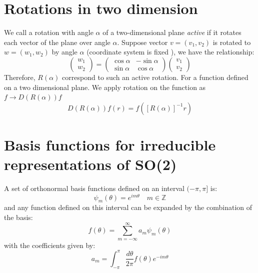 \documentclass{amsart}
\theoremstyle{remark}
\theoremstyle{remark}
\theoremstyle{definition}
\begin{document}
\section*{Rotations in two dimension}
We call a rotation with angle $\alpha$ of a two-dimensional plane \emph{active} 
if it rotates each vector of the plane over angle $\alpha$. 
Suppose vector $v = (v_1, v_2)$ is rotated to $w = (w_1, w_2)$ by angle $\alpha$ (coordinate system is fixed ), 
we have the relationship:
\begin{equation*}
    \left(\begin{matrix}
        w_1 \\ w_2
    \end{matrix}\right) = \left(\begin{matrix}
        \cos\alpha & -\sin\alpha \\ \sin\alpha & \cos\alpha
    \end{matrix}\right) \left(\begin{matrix}
        v_1 \\ v_2
    \end{matrix}\right)
\end{equation*}
Therefore, $R(\alpha)$ correspond to such an active rotation. 
For a function defined on a two dimensional plane. We apply rotation 
on the function as $f\to D(R(\alpha))f$
\begin{equation*}
    D(R(\alpha))f (r) = f([R(\alpha)]^{-1}r)
\end{equation*}

\vspace{10pt}
\section*{Basis functions for irreducible representations of SO(2)}

A set of orthonormal basis functions defined on an interval $(-\pi, \pi]$ is:
\begin{equation*}
    \psi_m (\theta) = e^{im\theta} \quad m \in \mathbb{Z}
\end{equation*}
and any function defined on this interval can be expanded by the combination
of the basis:
\begin{equation*}
    f(\theta) = \sum_{m=-\infty}^{\infty} a_m \psi_m(\theta)
\end{equation*}
with the coefficients given by:
\begin{equation*}
    a_m = \int_{-\pi}^{\pi} \frac{d\theta}{2\pi} f(\theta) e^{-im\theta}
\end{equation*}
\end{document}
